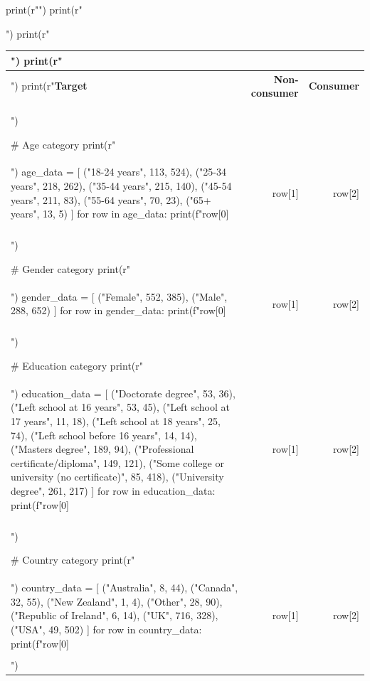 \documentclass{article}
\begin{document}
\begin{pycode}
print(r"\small")
print(r"\begin{center}")
print(r"\begin{tabular}{|l|r|r|} \hline")
print(r"\multicolumn{3}{|c|}{\textbf{Table 1: Demographic Summary}} \\ \hline")
print(r"\textbf{Target} & \textbf{Non-consumer} & \textbf{Consumer} \\ \hline")

# Age category
print(r"\multicolumn{3}{|l|}{\textbf{Age category}} \\ \hline")
age_data = [
    ("18-24 years", 113, 524),
    ("25-34 years", 218, 262),
    ("35-44 years", 215, 140),
    ("45-54 years", 211, 83),
    ("55-64 years", 70, 23),
    ("65+ years", 13, 5)
]
for row in age_data:
    print(f"{row[0]} & {row[1]} & {row[2]} \\\\ \hline")

# Gender category
print(r"\multicolumn{3}{|l|}{\textbf{Gender category}} \\ \hline")
gender_data = [
    ("Female", 552, 385),
    ("Male", 288, 652)
]
for row in gender_data:
    print(f"{row[0]} & {row[1]} & {row[2]} \\\\ \hline")

# Education category
print(r"\multicolumn{3}{|l|}{\textbf{Education category}} \\ \hline")
education_data = [
    ("Doctorate degree", 53, 36),
    ("Left school at 16 years", 53, 45),
    ("Left school at 17 years", 11, 18),
    ("Left school at 18 years", 25, 74),
    ("Left school before 16 years", 14, 14),
    ("Masters degree", 189, 94),
    ("Professional certificate/diploma", 149, 121),
    ("Some college or university (no certificate)", 85, 418),
    ("University degree", 261, 217)
]
for row in education_data:
    print(f"{row[0]} & {row[1]} & {row[2]} \\\\ \hline")

# Country category
print(r"\multicolumn{3}{|l|}{\textbf{Country category}} \\ \hline")
country_data = [
    ("Australia", 8, 44),
    ("Canada", 32, 55),
    ("New Zealand", 1, 4),
    ("Other", 28, 90),
    ("Republic of Ireland", 6, 14),
    ("UK", 716, 328),
    ("USA", 49, 502)
]
for row in country_data:
    print(f"{row[0]} & {row[1]} & {row[2]} \\\\ \hline")


\end{tabular}
\end{center}
\end{pycode}
\end{document}
